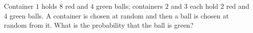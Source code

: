 Container $1$ holds $8$ red and $4$ green balls; containers $2$ and $3$ each hold $2$ red and $4$ green balls. A container is chosen at random and then a ball is chosen at random from it. What is the probability that the ball is green?
